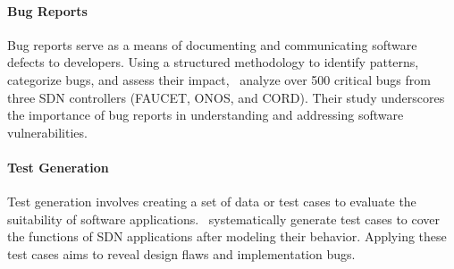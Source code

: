 \paragraph{Bug Reports} Bug reports serve as a means of documenting and communicating software defects to developers. Using a structured methodology to identify patterns, categorize bugs, and assess their impact,~\cite{9505089} analyze over 500 critical bugs from three SDN controllers (FAUCET, ONOS, and CORD). Their study underscores the importance of bug reports in understanding and addressing software vulnerabilities.

\paragraph{Test Generation} Test generation involves creating a set of data or test cases to evaluate the suitability of software applications.~\cite{8107437} systematically generate test cases to cover the functions of SDN applications after modeling their behavior. Applying these test cases aims to reveal design flaws and implementation bugs.

